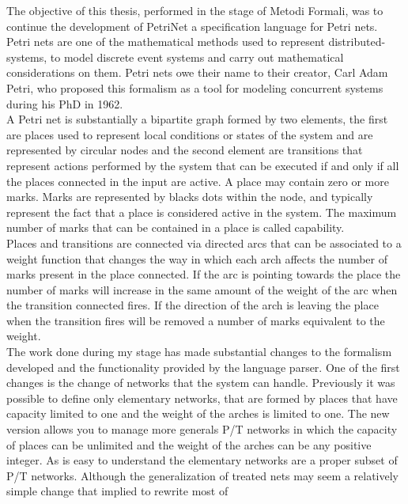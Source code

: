 \documentclass[english,12pt]{report}
\begin{document}


\onehalfspacing

The objective of this thesis, performed in the stage of Metodi Formali, was to continue the 
development of PetriNet a specification language for Petri nets. \\
Petri nets are one of the 
mathematical methods used to represent distributed-systems, to model discrete event systems 
and carry out mathematical considerations on them. Petri nets owe their name to their creator, Carl 
Adam Petri, who proposed this formalism as a tool for modeling concurrent systems during his PhD 
in 1962. \\
A Petri net is substantially a bipartite graph formed by two elements, the first are places 
used to represent local conditions or states of the system and are represented by circular nodes and 
the second element are transitions that represent actions performed by the system that can be 
executed if and only if all the places connected in the input are active. A place may contain zero or 
more marks. Marks are represented by blacks dots within the node, and typically represent the fact 
that a place is considered active in the system. The maximum number of marks that can be 
contained in a place is called capability. \\
Places and transitions are connected via directed arcs that can be associated to a weight function 
that changes the way in which each arch affects the number of marks present in the place 
connected. 
If the arc is pointing towards the place the number of marks will increase in the same amount of the 
weight of the arc when the transition connected fires. If the direction of the arch is leaving the place 
when the transition fires will be removed a number of marks equivalent to the weight.\\
The work done during my stage has made substantial changes to the formalism developed and 
the functionality provided by the language parser. One of the first changes is the change of
networks that the system can handle. Previously it was possible to define only elementary networks, 
that are formed by places that have capacity limited to one and the weight of the arches is limited to
one. The new version allows you to manage more generals P/T networks in which the capacity of 
places can be unlimited and the weight of the arches can be any positive integer. As is easy to 
understand the elementary networks are a proper subset of P/T networks. Although the 
generalization of treated nets may seem a relatively simple change that implied to rewrite most of 
\end{document}
